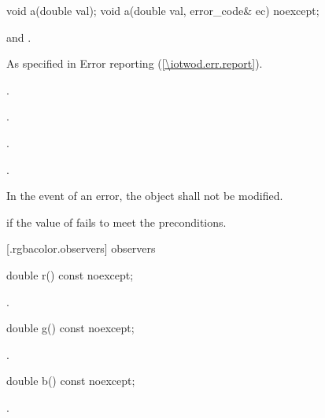 \begin{itemdecl}
	void a(double val);
	void a(double val, error_code& ec) noexcept;
\end{itemdecl}
\begin{itemdescr}
	\pnum
	\requires
	 and .
	
	\pnum
	\throws
	As specified in Error reporting (\ref{\iotwod.err.report}).
	
	\pnum
	\postconditions
	.
	
	.
	
	.
	
	.

	\pnum
	\remarks
	In the event of an error, the object shall not be modified.
	
	\pnum
	\errors
	 if the value of  fails to meet the preconditions.
	
\end{itemdescr}

 [\iotwod.rgbacolor.observers]{ observers}

\begin{itemdecl}
	double r() const noexcept;
\end{itemdecl}
\begin{itemdescr}
	\pnum
	\returns
	.
\end{itemdescr}

\begin{itemdecl}
	double g() const noexcept;
\end{itemdecl}
\begin{itemdescr}
	\pnum
	\returns
	.
\end{itemdescr}

\begin{itemdecl}
	double b() const noexcept;
\end{itemdecl}
\begin{itemdescr}
	\pnum
	\returns
	.
\end{itemdescr}

